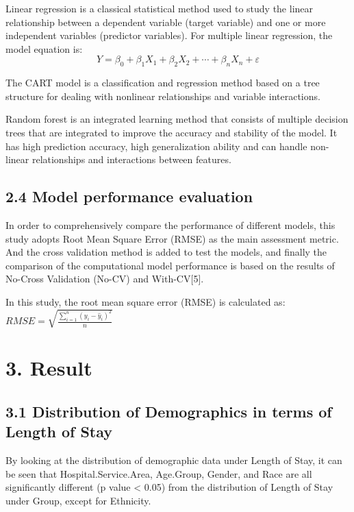 \documentclass[
  10pt,
]{article}
\begin{document}
Linear regression is a classical statistical method used to study the
linear relationship between a dependent variable (target variable) and
one or more independent variables (predictor variables). For multiple
linear regression, the model equation is: \[
Y = \beta_0 + \beta_1X_1 + \beta_2X_2 + \cdots + \beta_nX_n + \varepsilon
\]

The CART model is a classification and regression method based on a tree
structure for dealing with nonlinear relationships and variable
interactions.

Random forest is an integrated learning method that consists of multiple
decision trees that are integrated to improve the accuracy and stability
of the model. It has high prediction accuracy, high generalization
ability and can handle non-linear relationships and interactions between
features.

\subsection{2.4 Model performance
evaluation}\label{model-performance-evaluation}

In order to comprehensively compare the performance of different models,
this study adopts Root Mean Square Error (RMSE) as the main assessment
metric. And the cross validation method is added to test the models, and
finally the comparison of the computational model performance is based
on the results of No-Cross Validation (No-CV) and With-CV{[}5{]}.

In this study, the root mean square error (RMSE) is calculated as:
\(RMSE = \sqrt{\frac{\sum_{i=1}^n (y_i - \hat{y}_i)^2}{n}}\)

\section{3. Result}\label{result}

\subsection{3.1 Distribution of Demographics in terms of Length of
Stay}\label{distribution-of-demographics-in-terms-of-length-of-stay}

By looking at the distribution of demographic data under Length of Stay,
it can be seen that Hospital.Service.Area, Age.Group, Gender, and Race
are all significantly different (p value \textless{} 0.05) from the
distribution of Length of Stay under Group, except for Ethnicity.
\end{document}
